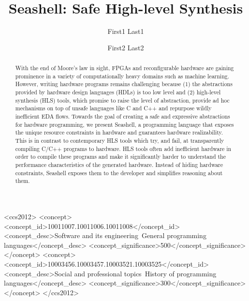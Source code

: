 \documentclass[acmsmall,review,anonymous]{acmart}\settopmatter{printfolios=true,printccs=false,printacmref=false}
\begin{document}
\title[]{Seashell: Safe High-level Synthesis}

\author{First1 Last1}
\author{First2 Last2}


\begin{abstract}
With the end of Moore's law in sight, FPGAs and reconfigurable hardware are
gaining prominence in a variety of computationally heavy domains such as
machine learning. However, writing hardware programs remains challenging
because (1) the abstractions provided by hardware design languages (HDLs) is
too low level and (2) high-level synthesis (HLS) tools, which promise to
raise the level of abstraction, provide ad hoc mechanisms on top of unsafe
languages like C and C++ and repurpose wildly inefficient EDA flows. Towards
the goal of creating a safe and expressive abstractions for hardware
programming, we present Seashell, a programming language that exposes the
unique resource constraints in hardware and guarantees hardware
realizability. This is in contrast to contemporary HLS tools which try, and
fail, at transparently compiling C/C++ programs to hardware. HLS tools often
add inefficient hardware in order to compile these programs and make it
significantly harder to understand the performance characteristics of the
generated hardware. Instead of hiding hardware constraints, Seashell exposes
them to the developer and simplifies reasoning about them.
\end{abstract}

\begin{CCSXML}
<ccs2012>
<concept>
<concept_id>10011007.10011006.10011008</concept_id>
<concept_desc>Software and its engineering~General programming languages</concept_desc>
<concept_significance>500</concept_significance>
</concept>
<concept>
<concept_id>10003456.10003457.10003521.10003525</concept_id>
<concept_desc>Social and professional topics~History of programming languages</concept_desc>
<concept_significance>300</concept_significance>
</concept>
</ccs2012>
\end{CCSXML}
\end{document}
